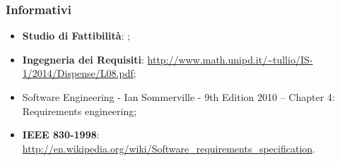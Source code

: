 	\subsubsection{Informativi}
		\begin{itemize}
			\item \textbf{Studio di Fattibilità}: \docNameVersionSdF;
			\item \textbf{Ingegneria dei Requisiti}: \url{http://www.math.unipd.it/~tullio/IS-1/2014/Dispense/L08.pdf};
			\item Software Engineering - Ian Sommerville - 9th Edition 2010 – Chapter 4: Requirements engineering;
			\item \textbf{IEEE 830-1998}: \url{http://en.wikipedia.org/wiki/Software_requirements_specification}.
		\end{itemize}
